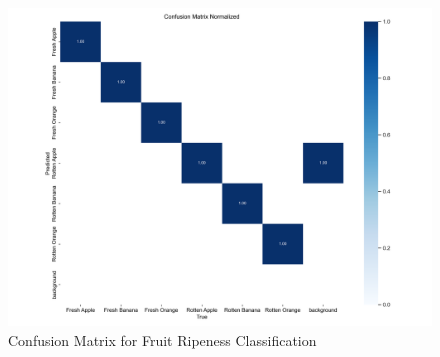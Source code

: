 \begin{figure}[ht]
\centering
\includegraphics[width=0.95\linewidth]{datas/agriculture/confusion_matrix_normalized.png}
\caption{Confusion Matrix for Fruit Ripeness Classification}
\label{fig:fruit_confusion}
\end{figure}
